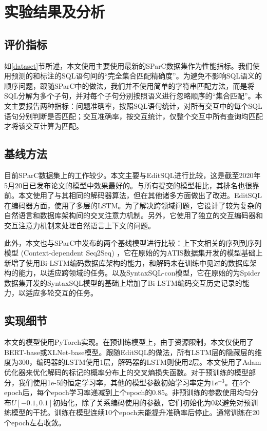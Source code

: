 \chapter{实验结果及分析}

\section{评价指标}

如\ref{dataset}节所述，本文使用主要使用最新的SParC数据集作为性能指标。我们使用预测的和标注的SQL语句间的“完全集合匹配精确度”。为避免不影响SQL语义的顺序问题，跟随SParC\cite{sparc19}中的做法，我们并不使用简单的字符串匹配方法，而是将SQL分解为多个子句，并对每个子句分别按照语义进行忽略顺序的“集合匹配”。本文主要报告两种指标：问题准确率，按照SQL语句统计，对所有交互中的每个SQL语句分别判断是否匹配；交互准确率，按交互统计，仅整个交互中所有查询均匹配才将该交互计算为匹配。

\section{基线方法}

目前SParC数据集上的工作较少。本文主要与EditSQL进行比较，这是截至2020年5月20日已发布论文的模型中效果最好的。与所有提交的模型相比，其排名也很靠前。本文使用了与其相同的解码器算法，但在其他诸多方面做出了改进。EditSQL在编码器方面，使用了多层的LSTM。为了解决跨领域问题，它设计了较为复杂的自然语言和数据库架构间的交叉注意力机制。另外，它使用了独立的交互编码器和交互注意力机制来处理自然语言上下文的问题。

此外，本文也与SParC\cite{sparc19}中发布的两个基线模型进行比较：上下文相关的序列到序列模型 (Context-dependent Seq2Seq) ，它在原始的为ATIS数据集开发的模型基础上新增了使用Bi-LSTM编码数据库架构的能力，和解码未在训练中见过的数据库架构的能力，以适应跨领域的任务。以及SyntaxSQL-con模型，它在原始的为Spider数据集开发的SyntaxSQL\cite{syntaxsqlnet18}模型的基础上增加了Bi-LSTM编码交互历史记录的能力，以适应多轮交互的任务。

\section{实现细节}

本文的模型使用PyTorch\cite{pytorch19}实现。在预训练模型上，由于资源限制，本文仅使用了BERT-base或XLNet-base模型。跟随EditSQL的做法，所有LSTM层的隐藏层的维度为300，编码器的LSTM使用1层，解码器的LSTM则使用2层。本文使用了Adam\cite{Adam14}优化器来优化解码的标记的概率分布上的交叉熵损失函数。对于预训练的模型部分，我们使用1e-5的恒定学习率，其他的模型参数初始学习率定为$1e^{-3}$。在5个epoch后，每个epoch学习率递减到上个epoch的0.85。非预训练的参数使用均匀分布$U\left[-0.1,0.1\right]$初始化，除了关系编码使用的参数，它们初始化为0以避免对预训练模型的干扰。训练在模型连续10个epoch未能提升准确率后停止。通常训练在20个epoch左右收敛。

